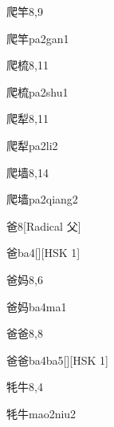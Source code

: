 \begin{entry}{爬竿}{8,9}
  \begin{phonetics}{爬竿}{pa2gan1}
  \end{phonetics}
\end{entry}

\begin{entry}{爬梳}{8,11}
  \begin{phonetics}{爬梳}{pa2shu1}
  \end{phonetics}
\end{entry}

\begin{entry}{爬犁}{8,11}
  \begin{phonetics}{爬犁}{pa2li2}
  \end{phonetics}
\end{entry}

\begin{entry}{爬墙}{8,14}
  \begin{phonetics}{爬墙}{pa2qiang2}
  \end{phonetics}
\end{entry}

\begin{entry}{爸}{8}[Radical 父]
  \begin{phonetics}{爸}{ba4}[][HSK 1]
  \end{phonetics}
\end{entry}

\begin{entry}{爸妈}{8,6}
  \begin{phonetics}{爸妈}{ba4ma1}
  \end{phonetics}
\end{entry}

\begin{entry}{爸爸}{8,8}
  \begin{phonetics}{爸爸}{ba4ba5}[][HSK 1]
  \end{phonetics}
\end{entry}

\begin{entry}{牦牛}{8,4}
  \begin{phonetics}{牦牛}{mao2niu2}
  \end{phonetics}
\end{entry}

